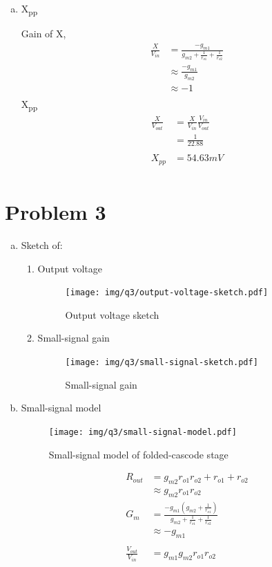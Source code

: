 \documentclass{article}
\begin{document}
\begin{enumerate}[(a)]
\item X\textsubscript{pp}

Gain of X,
\begin{equation*}
\begin{aligned}
\frac{X}{V_{in}} &= \frac{-g_{m1}}{g_{m2} + \frac{1}{r_{o1}} + \frac{1}{r_{o2}}} \\
&\approx \frac{-g_{m1}}{g_{m2}} \\
&\approx -1 \\
\end{aligned}
\end{equation*}
X\textsubscript{pp}
\begin{equation*}
\begin{aligned}
\frac{X}{V_{out}} &= \frac{X}{V_{in}}\frac{V_{in}}{V_{out}} \\
&= \frac{1}{22.88} \\
\\
X_{pp} &= 54.63 mV\\
\end{aligned}
\end{equation*}
\end{enumerate}
\section{Problem 3}
\label{sec:org9935c25}
\begin{enumerate}[(a)]
\item Sketch of:
\begin{enumerate}[1.]
\item Output voltage
\begin{figure}[H]
\centering
\texttt{[image: img/q3/output-voltage-sketch.pdf]}
\caption{\label{fig:output-voltage-sketch-q3}Output voltage sketch}
\end{figure}
\item Small-signal gain
\begin{figure}[H]
\centering
\texttt{[image: img/q3/small-signal-sketch.pdf]}
\caption{\label{fig:small-signal-sketch-q3}Small-signal gain}
\end{figure}
\end{enumerate}
\item Small-signal model
\begin{figure}[H]
\centering
\texttt{[image: img/q3/small-signal-model.pdf]}
\caption{\label{fig:small-signal-model-q3}Small-signal model of folded-cascode stage}
\end{figure}

\begin{equation*}
\begin{aligned}
R_{out} &= g_{m2}r_{o1}r_{o2} + r_{o1} + r_{o2} \\
&\approx g_{m2}r_{o1}r_{o2}
\\
G_{m} &= \frac{-g_{m1}(g_{m2} + \frac{1}{r_{o1}})}{g_{m2} + \frac{1}{r_{o1}} + \frac{1}{r_{o2}}} \\
&\approx -g_{m1} \\
\\
\frac{V_{out}}{V_{in}} &= g_{m1}g_{m2}r_{o1}r_{o2} \\
\end{aligned}
\end{equation*}
\end{enumerate}
\end{document}
